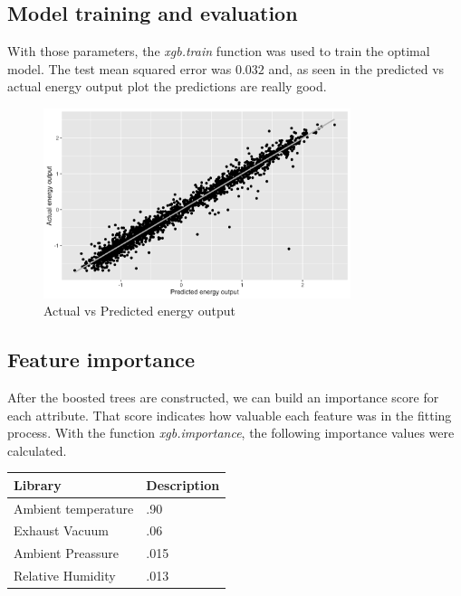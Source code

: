 \subsection{Model training and evaluation}
With those parameters, the \textit{xgb.train} function was used to train the optimal model. The test mean squared error was $0.032$ and, as seen in the predicted vs actual energy output plot the predictions are really good.

\begin{figure}[H]
    \begin{center}
        \includegraphics[width=0.8\textwidth]{img/pred_act.jpg}
        \caption{Actual vs Predicted energy output}
    \end{center}
\end{figure}

\subsection{Feature importance}

After the boosted trees are constructed, we can build an importance score for each attribute. That score indicates how valuable each feature was in the fitting process. With the function \textit{xgb.importance}, the following importance values were calculated.
\newpage

\begin{center}
    \begin{tabular}{ |p{4cm}||p{3cm}|}
         \hline
         Library & Description \\
         \hline
         Ambient temperature & .90 \\
         Exhaust Vacuum & .06 \\
         Ambient Preassure & .015 \\
         Relative Humidity & .013 \\
         \hline
    \end{tabular}
\end{center}

